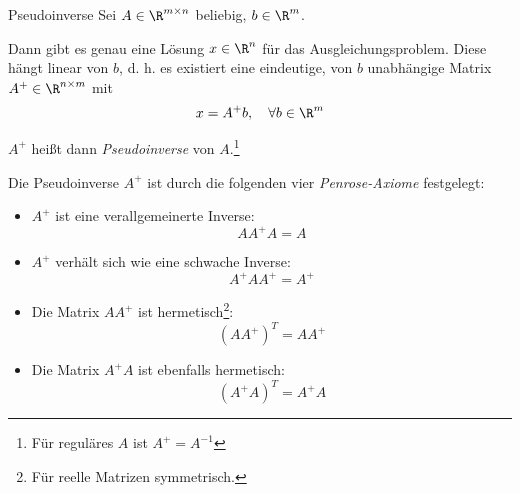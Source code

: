\begin{defi}{Pseudoinverse}
    Sei $A \in \R^{m \times n}$ beliebig, $b \in \R^m$.

    Dann gibt es genau eine Lösung $x \in \R^n$ für das Ausgleichungsproblem.
    Diese hängt linear von $b$, d. h. es existiert eine eindeutige, von $b$ unabhängige Matrix $A^+ \in \R^{n \times m}$ mit
    \[
        x = A^+ b, \quad \forall b \in \R^m
    \]

    $A^+$ heißt dann \emph{Pseudoinverse} von $A$.\footnote{Für reguläres $A$ ist $A^+ = A^{-1}$}

    Die Pseudoinverse $A^+$ ist durch die folgenden vier \emph{Penrose-Axiome} festgelegt:
    \begin{itemize}
        \item $A^+$ ist eine verallgemeinerte Inverse:
              \[
                  AA^+A = A
              \]
        \item $A^+$ verhält sich wie eine schwache Inverse:
              \[
                  A^+AA^+ = A^+
              \]
        \item Die Matrix $AA^+$ ist hermetisch\footnote{Für reelle Matrizen symmetrisch.}:
              \[
                  (AA^+)^T = AA^+
              \]
        \item Die Matrix $A^+A$ ist ebenfalls hermetisch:
              \[
                  (A^+A)^T = A^+A
              \]
    \end{itemize}
\end{defi}

